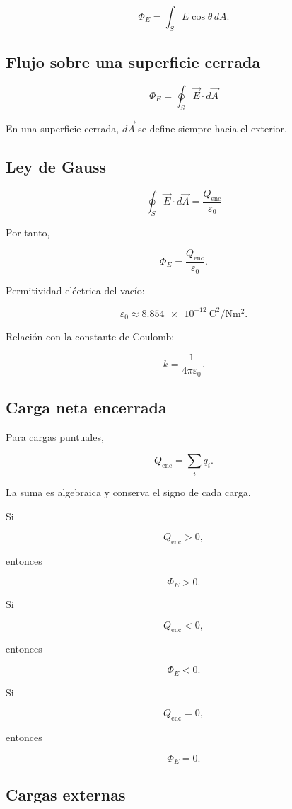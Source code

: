 \[
\boxed{
\Phi_E=\int_S E\cos\theta\,dA
}.
\]


\subsection{Flujo sobre una superficie cerrada}

\[
\boxed{
\Phi_E=\oint_S\vec E\cdot d\vec A
}
\]

En una superficie cerrada, \(d\vec A\) se define siempre hacia el exterior.


\subsection{Ley de Gauss}

\[
\boxed{
\oint_S\vec E\cdot d\vec A
=
\frac{Q_{\text{enc}}}{\varepsilon_0}
}
\]

Por tanto,

\[
\boxed{
\Phi_E=\frac{Q_{\text{enc}}}{\varepsilon_0}
}.
\]

Permitividad eléctrica del vacío:

\[
\boxed{
\varepsilon_0\approx
\SI{8.854e-12}{\coulomb\squared\per\newton\metre\squared}
}.
\]

Relación con la constante de Coulomb:

\[
\boxed{
k=\frac{1}{4\pi\varepsilon_0}
}.
\]


\subsection{Carga neta encerrada}

Para cargas puntuales,

\[
\boxed{
Q_{\text{enc}}=\sum_iq_i
}.
\]

La suma es algebraica y conserva el signo de cada carga.

Si

\[
Q_{\text{enc}}>0,
\]

entonces

\[
\boxed{\Phi_E>0}.
\]

Si

\[
Q_{\text{enc}}<0,
\]

entonces

\[
\boxed{\Phi_E<0}.
\]

Si

\[
Q_{\text{enc}}=0,
\]

entonces

\[
\boxed{\Phi_E=0}.
\]


\subsection{Cargas externas}

